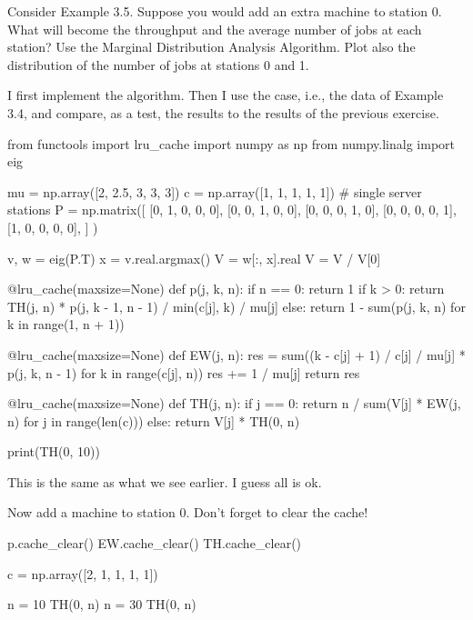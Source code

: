 \begin{exercise}
  Consider Example 3.5. Suppose you would add an extra machine to
  station 0. What will become the throughput and the average number of
  jobs at each station? Use the Marginal Distribution Analysis
  Algorithm. Plot also the distribution of the number of jobs at
  stations 0 and 1.
\begin{solution}
    I first implement the algorithm. Then I use the case, i.e., the
    data of Example 3.4, and compare, as a test, the results to the
    results of the previous exercise.

\begin{pyconsole}
from functools import lru_cache
import numpy as np
from numpy.linalg import eig

mu = np.array([2, 2.5, 3, 3, 3])
c = np.array([1, 1, 1, 1, 1])  # single server stations
P = np.matrix([
    [0, 1, 0, 0, 0],
    [0, 0, 1, 0, 0],
    [0, 0, 0, 1, 0],
    [0, 0, 0, 0, 1],
    [1, 0, 0, 0, 0],
]
)

v, w = eig(P.T)
x = v.real.argmax()
V = w[:, x].real
V = V / V[0]


@lru_cache(maxsize=None)
def p(j, k, n):
    if n == 0:
        return 1
    if k > 0:
        return TH(j, n) * p(j, k - 1, n - 1) / min(c[j], k) / mu[j]
    else:
        return 1 - sum(p(j, k, n) for k in range(1, n + 1))


@lru_cache(maxsize=None)
def EW(j, n):
    res = sum((k - c[j] + 1) / c[j] / mu[j] * p(j, k, n - 1)
              for k in range(c[j], n))
    res += 1 / mu[j]
    return res


@lru_cache(maxsize=None)
def TH(j, n):
    if j == 0:
        return n / sum(V[j] * EW(j, n) for j in range(len(c)))
    else:
        return V[j] * TH(0, n)

print(TH(0, 10))
  
\end{pyconsole}

This is the same as what we see earlier. I guess all is ok. 

Now add a machine to station 0. Don't forget to clear the cache!

\begin{pyconsole}
p.cache_clear()
EW.cache_clear()
TH.cache_clear()

c = np.array([2, 1, 1, 1, 1])

n = 10
TH(0, n)
n = 30
TH(0, n)
  
\end{pyconsole}


\end{solution}
\end{exercise}
